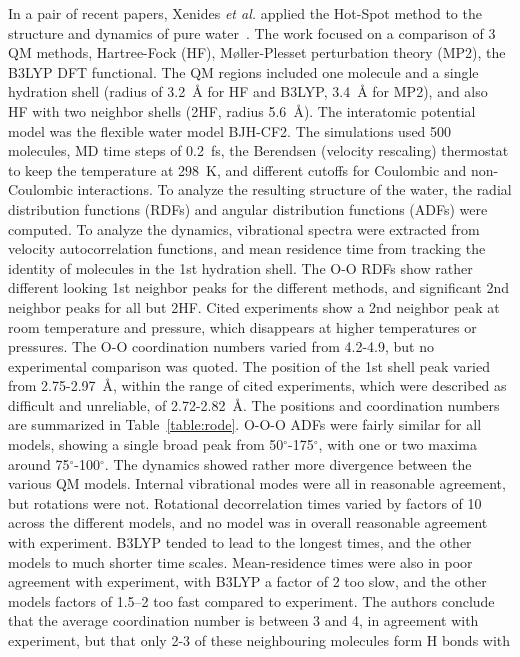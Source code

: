 \documentclass[11pt]{revtex4}
\begin{document}
In a pair of recent papers, Xenides {\it et al.} applied the Hot-Spot
method to the structure and dynamics of pure
water~\cite{xenides_j_chem_phys_2005a,xenides_j_mol_liq_2006a}.
The work focused on a comparison of 3 QM methods, Hartree-Fock (HF),
M{\o}ller-Plesset perturbation theory (MP2), the B3LYP DFT functional.
The QM regions included one molecule and a single hydration shell
(radius of 3.2~{\AA} for HF and B3LYP, 3.4~{\AA} for MP2), and also
HF with two neighbor shells (2HF, radius 5.6~{\AA}).  The interatomic
potential model was the flexible water model BJH-CF2.  The simulations
used 500 molecules, MD time steps of 0.2~fs, the Berendsen (velocity
rescaling) thermostat to keep the temperature at 298~K, and different
cutoffs for Coulombic and non-Coulombic interactions.  To analyze
the resulting structure of the water, the radial distribution
functions (RDFs) and angular distribution functions (ADFs) were
computed.  To analyze the dynamics, vibrational spectra were extracted
from velocity autocorrelation functions, and mean residence time
from tracking the identity of molecules in the 1st hydration shell.
The O-O RDFs show rather different looking 1st neighbor peaks for
the different methods, and significant 2nd neighbor peaks for all
but 2HF.  Cited experiments show a 2nd neighbor peak at room
temperature and pressure, which disappears at higher temperatures
or pressures.  The O-O coordination numbers varied from 4.2-4.9,
but no experimental comparison was quoted.  The position of the 1st
shell peak varied from 2.75-2.97~{\AA}, within the range of cited
experiments, which were described as difficult and unreliable, of
2.72-2.82~{\AA}.  The positions and coordination numbers are
summarized in Table~\ref{table:rode}.
O-O-O ADFs were fairly similar for all models,
showing a single broad peak from 50$^\circ$-175$^\circ$, with one
or two maxima around 75$^\circ$-100$^\circ$.  The dynamics showed
rather more divergence between the various QM models.  Internal
vibrational modes were all in reasonable agreement, but rotations
were not.  Rotational decorrelation times varied by factors of 10
across the different models, and no model was in overall reasonable
agreement with experiment.  B3LYP tended to lead to the longest
times, and the other models to much shorter time scales.  Mean-residence
times were also in poor agreement with experiment, with B3LYP a
factor of 2 too slow, and the other models factors of 1.5--2 too
fast compared to experiment.  The authors conclude that the average
coordination number is between 3 and 4, in agreement with experiment,
but that only 2-3 of these neighbouring molecules form H bonds with
\end{document}

